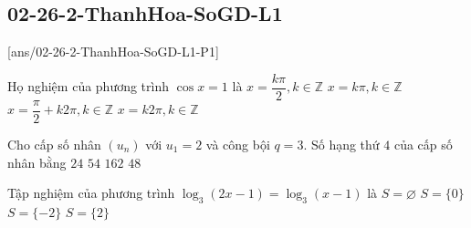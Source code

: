 \subsection{02-26-2-ThanhHoa-SoGD-L1}
\caulc
{}[ans/02-26-2-ThanhHoa-SoGD-L1-P1]
\begin{ex}%
	Họ nghiệm của phương trình $\cos x=1$ là
	\choice
	{$x=\dfrac{k\pi}{2}, k \in \mathbb{Z}$}
	{$x=k\pi, k \in \mathbb{Z}$}
	{$x=\dfrac{\pi}{2} + k2\pi, k \in \mathbb{Z}$}
	{\True $x = k2\pi, k \in \mathbb{Z}$}
\end{ex}
\begin{ex}%
	Cho cấp số nhân $\left( u_n \right)$ với $u_1 = 2$ và công bội $q = 3$. Số hạng thứ $4$ của cấp số nhân bằng
	\choice
	{$24$}
	{\True $54$}
	{$162$}
	{$48$}
\end{ex}
\begin{ex}%
	Tập nghiệm của phương trình $\log_3(2x - 1) = \log_3(x - 1)$ là
	\choice
	{\True $S = \varnothing$}
	{$S = \{0\}$}
	{$S = \{-2\}$}
	{$S = \{2\}$}
\end{ex}
